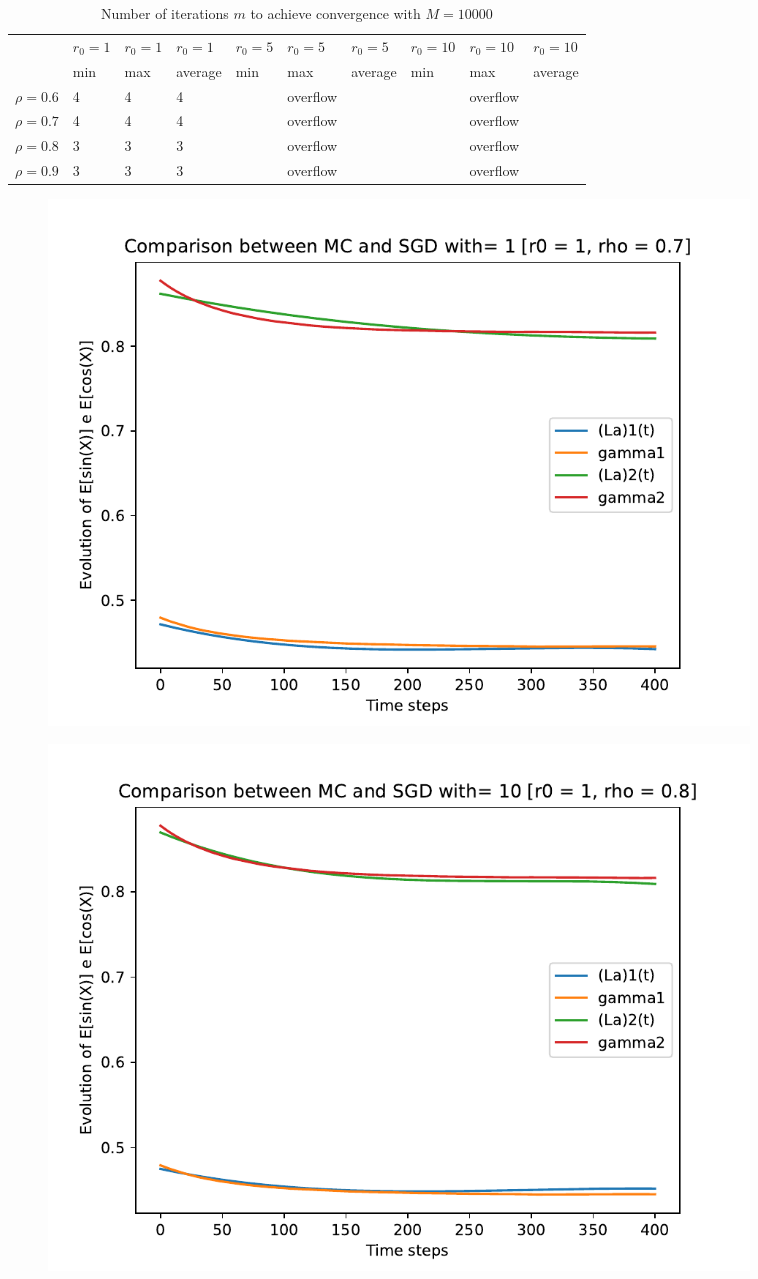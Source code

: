 \documentclass[a4paper,11pt,openright]{report}
\begin{document}
\begin{table}[H]
\centering
\addtolength{\leftskip}{-1.5cm}
\addtolength{\rightskip}{-1.5cm}
\begin{tabular}{|c|lllllllll|}
\hline
$ $ & $r_0 = 1$ & $r_0 = 1$ & $r_0 = 1$ & $r_0 = 5$ & $r_0 = 5$ & $r_0 = 5$ & $r_0 = 10$ & $r_0 = 10$ & $r_0 = 10$  \\
$ $ & min & max & average & min & max & average & min & max & average \\ 
\hline
$\rho = 0.6$ & 4 & 4 & 4 &  & overflow &  &  & overflow &  \\

$\rho = 0.7$ & 4 & 4 & 4 &  & overflow &  &  & overflow &  \\

$\rho = 0.8$ & 3 & 3 & 3 &  & overflow &  &  & overflow & \\

$\rho = 0.9$ & 3 & 3 & 3 &  & overflow &  &  & overflow & \\
\hline
\end{tabular}
\caption{Number of iterations $m$ to achieve convergence with $M = 10000$}
\end{table}
\begin{figure}[H]
\centering
\includegraphics[width=0.9\textwidth]{images/graphics T = 4/n = 3, M = 1 sine and cosine.pdf}
\end{figure}
\begin{figure}[H]
\centering
\includegraphics[width=0.9\textwidth]{images/graphics T = 4/n = 3, M = 10 sine and cosine.pdf}
\end{figure}
\end{document}

